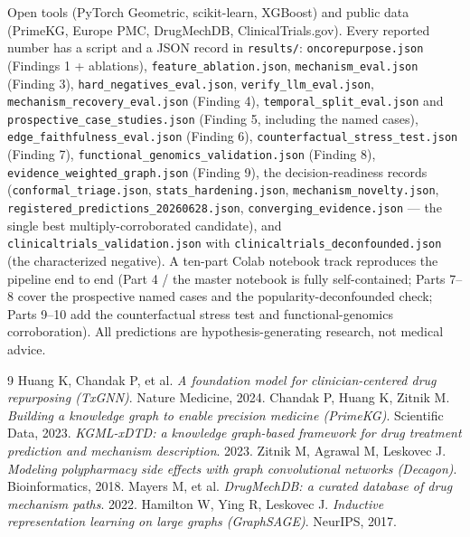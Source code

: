 \documentclass[11pt]{article}
\begin{document}
\begin{sloppypar}
Open tools (PyTorch Geometric, scikit-learn, XGBoost) and public data (PrimeKG, Europe
PMC, DrugMechDB, ClinicalTrials.gov). Every reported number has a script and a JSON record
in \texttt{results/}: \texttt{oncorepurpose.json} (Findings 1 + ablations),
\texttt{feature\_ablation.json}, \texttt{mechanism\_eval.json} (Finding 3),
\texttt{hard\_negatives\_eval.json}, \texttt{verify\_llm\_eval.json},
\texttt{mechanism\_recovery\_eval.json} (Finding 4), \texttt{temporal\_split\_eval.json}
and \texttt{prospective\_case\_studies.json} (Finding 5, including the named cases),
\texttt{edge\_faithfulness\_eval.json} (Finding 6),
\texttt{counterfactual\_stress\_test.json} (Finding 7),
\texttt{functional\_genomics\_validation.json} (Finding 8),
\texttt{evidence\_weighted\_graph.json} (Finding 9), the decision-readiness records
(\texttt{conformal\_triage.json}, \texttt{stats\_hardening.json},
\texttt{mechanism\_novelty.json}, \texttt{registered\_predictions\_20260628.json},
\texttt{converging\_evidence.json} --- the single best multiply-corroborated candidate),
and \texttt{clinicaltrials\_validation.json}
with \texttt{clinicaltrials\_deconfounded.json} (the characterized negative). A ten-part Colab notebook track
reproduces the pipeline end to end (Part 4 / the master notebook is fully self-contained; Parts 7--8 cover
the prospective named cases and the popularity-deconfounded check; Parts 9--10 add the counterfactual
stress test and functional-genomics corroboration). All predictions are
hypothesis-generating research, not medical advice.
\end{sloppypar}

\begin{thebibliography}{9}
\small
{} Huang K, Chandak P, et al. \textit{A foundation model for
clinician-centered drug repurposing (TxGNN)}. Nature Medicine, 2024.
 Chandak P, Huang K, Zitnik M. \textit{Building a knowledge graph to
enable precision medicine (PrimeKG)}. Scientific Data, 2023.
 \textit{KGML-xDTD: a knowledge graph-based framework for drug treatment
prediction and mechanism description}. 2023.
 Zitnik M, Agrawal M, Leskovec J. \textit{Modeling polypharmacy side
effects with graph convolutional networks (Decagon)}. Bioinformatics, 2018.
 Mayers M, et al. \textit{DrugMechDB: a curated database of drug
mechanism paths}. 2022.
 Hamilton W, Ying R, Leskovec J. \textit{Inductive representation learning on
large graphs (GraphSAGE)}. NeurIPS, 2017.
\end{thebibliography}
\end{document}
